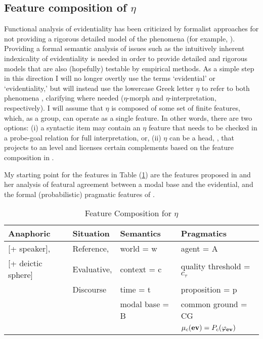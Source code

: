 \documentclass{article}
\begin{document}
\subsection{Feature composition of $\eta$}\label{etacomp} 
Functional analysis of evidentiality has been criticized by formalist approaches for not providing a rigorous detailed model of the phenomena (for example, ). Providing a formal semantic analysis of issues such as the intuitively inherent indexicality of evidentiality is needed in order to provide detailed and rigorous models that are also (hopefully) testable by empirical methods. As a simple step in this direction I will no longer overtly use the terms `evidential' or `evidentiality,' but will instead use the lowercase Greek letter $\eta$ to refer to both phenomena , clarifying where needed ($\eta$-morph and $\eta$-interpretation, respectively). I will assume that $\eta$ is composed of some set of finite features, which, as a group, can operate as a single feature. In other words, there are two options: (i) a syntactic item may contain an $\eta$ feature that needs to be checked in a probe-goal relation for full interpretation, or, (ii) $\eta$ can be a head, \obar{$\eta$}, that projects to an \iibar{$\eta$} level and licenses certain complements based on the feature composition in \obar{$\eta$}.

My starting point for the features in Table (\ref{featuretable}) are the features proposed in \cite{speas04evdparadigms,speas07evdfunctional} and her analysis of featural agreement between a modal base and the evidential, and the formal (probabilistic) pragmatic features of \cite{davispottsspeas07pragevd}.

\begin{table}[!h]
\caption{Feature Composition for $\eta$}\label{featuretable}
\begin{tabular}{|l||l||l||l|}
\hline
{\sc Anaphoric} & {\sc Situation} & {\sc Semantics} & {\sc Pragmatics}\\
\hline
\hline
{}[+ speaker],       & Reference,  & world = w         & agent = A\\ 
{}[+ deictic sphere] & Evaluative, & context = c       & quality threshold = $c_{\tau}$\\
{}                   & Discourse   & time = t          & proposition = p\\
{}                   & {}          & modal base = B    & common ground = CG\\
{}                   & {}          & {}                & $\mu_ {c}({\bf ev}) = P_{c}(\varphi_{{\bf ev}})$\\ 
\hline 
\end{tabular}
\end{table}
\end{document}
